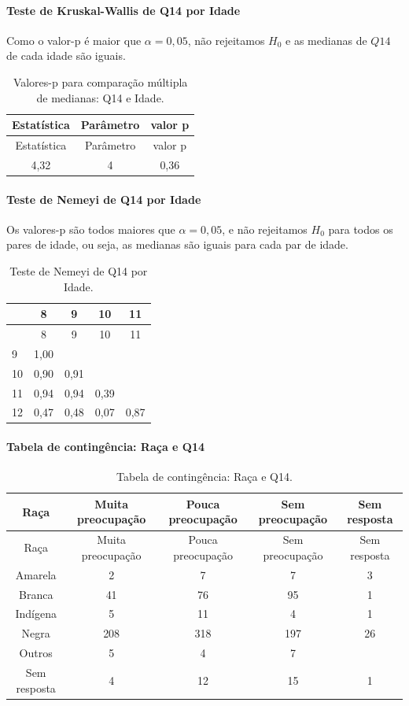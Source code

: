 \documentclass[]{article}
\let\oldparagraph\paragraph
\renewcommand{\paragraph}[1]{\oldparagraph{#1}\mbox{}}
\begin{document}
\hypertarget{teste-de-kruskal-wallis-de-q14-por-idade}{%
\paragraph{Teste de Kruskal-Wallis de Q14 por Idade}\label{teste-de-kruskal-wallis-de-q14-por-idade}}

Como o valor-p é maior que \(\alpha=0,05\), não rejeitamos \(H_0\) e as medianas de \(Q14\) de cada idade são iguais.

\begin{longtable}[]{@{}ccc@{}}
\caption{\label{tab:unnamed-chunk-79}Valores-p para comparação múltipla de medianas: Q14 e Idade.}\tabularnewline
\toprule
Estatística & Parâmetro & valor p\tabularnewline
\midrule
\endfirsthead
\toprule
Estatística & Parâmetro & valor p\tabularnewline
\midrule
\endhead
4,32 & 4 & 0,36\tabularnewline
\bottomrule
\end{longtable}

\hypertarget{teste-de-nemeyi-de-q14-por-idade}{%
\paragraph{Teste de Nemeyi de Q14 por Idade}\label{teste-de-nemeyi-de-q14-por-idade}}

Os valores-p são todos maiores que \(\alpha=0,05\), e não rejeitamos \(H_0\) para todos os pares de idade, ou seja, as medianas são iguais para cada par de idade.

\begin{longtable}[]{@{}lcccc@{}}
\caption{\label{tab:unnamed-chunk-80}Teste de Nemeyi de Q14 por Idade.}\tabularnewline
\toprule
& 8 & 9 & 10 & 11\tabularnewline
\midrule
\endfirsthead
\toprule
& 8 & 9 & 10 & 11\tabularnewline
\midrule
\endhead
9 & 1,00 & & &\tabularnewline
10 & 0,90 & 0,91 & &\tabularnewline
11 & 0,94 & 0,94 & 0,39 &\tabularnewline
12 & 0,47 & 0,48 & 0,07 & 0,87\tabularnewline
\bottomrule
\end{longtable}

\cleardoublepage

\hypertarget{tabela-de-continguxeancia-rauxe7a-e-q14}{%
\paragraph{Tabela de contingência: Raça e Q14}\label{tabela-de-continguxeancia-rauxe7a-e-q14}}

\begin{longtable}[]{@{}ccccc@{}}
\caption{\label{tab:unnamed-chunk-81}Tabela de contingência: Raça e Q14.}\tabularnewline
\toprule
Raça & Muita preocupação & Pouca preocupação & Sem preocupação & Sem resposta\tabularnewline
\midrule
\endfirsthead
\toprule
Raça & Muita preocupação & Pouca preocupação & Sem preocupação & Sem resposta\tabularnewline
\midrule
\endhead
Amarela & 2 & 7 & 7 & 3\tabularnewline
Branca & 41 & 76 & 95 & 1\tabularnewline
Indígena & 5 & 11 & 4 & 1\tabularnewline
Negra & 208 & 318 & 197 & 26\tabularnewline
Outros & 5 & 4 & 7 &\tabularnewline
Sem resposta & 4 & 12 & 15 & 1\tabularnewline
\bottomrule
\end{longtable}
\end{document}
